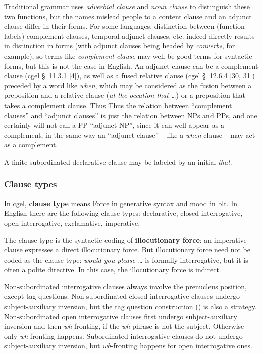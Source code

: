 \documentclass{article}
\newcommand*{\citesec}[1]{\S~{#1}}
\newcommand*{\concept}[1]{\textbf{#1}}
\newcommand*{\term}[1]{\emph{#1}}
\newcommand*{\corpus}[1]{\emph{#1}}
\begin{document}
Traditional grammar uses \term{adverbial clause} and \term{noun clause} 
to distinguish these two functions,
but the names mislead people to a content clause and an adjunct clause differ in their forms.
For some languages, distinction between (function labels) complement clauses, temporal adjunct clauses, etc. 
indeed directly results in distinction in forms
(with adjunct clauses being headed by \term{converbs}, for example),
so terms like \term{complement clause} may well be good terms for syntactic forms,
but this is not the case in English.
An adjunct clause can be a complement clause (\ac{cgel} \citesec{11.3.1} [4]),
as well as a fused relative clause (\ac{cgel} \citesec{12.6.4} [30, 31])
preceded by a word like \corpus{when},
which may be considered as the fusion between a preposition and a relative clause 
(\corpus{at the occation that \dots})
or a preposition that takes a complement clause.
Thus %
Thus the relation between ``complement clauses'' and ``adjunct clauses'' is 
just the relation between NPs and PPs, 
and one certainly will not call a PP ``adjunct NP'',
since it can well appear as a complement,
in the same way an ``adjunct clause'' -- like a \corpus{when} clause --
may act as a complement.

A finite subordinated declarative clause may be labeled by an initial \corpus{that}.

\subsubsection{Clause types}\label{sec:force}

In \ac{cgel}, \concept{clause type} means Force in generative syntax and mood in \ac{blt}.
In English there are the following clause types:
declarative, closed interrogative, open interrogative, exclamative, imperative.

The clause type is the syntactic coding of \concept{illocutionary force}:
an imperative clause expresses a direct illocutionary force.
But illocutionary force need not be coded as the clause type:
\corpus{would you please \dots} is formally interrogative, 
but it is often a polite directive.
In this case, the illocutionary force is indirect.

Non-subordinated interrogative clauses always involve the prenucleus position,
except tag questions.
Non-subordinated closed interrogative clauses undergo subject-auxiliary inversion,
but the tag question construction () is also a strategy.
Non-subordinated open interrogative clauses first undergo subject-auxiliary inversion
and then \corpus{wh}-fronting, if the \corpus{wh}-phrase is not the subject.
Otherwise only \corpus{wh}-fronting happens.
Subordinated interrogative clauses do not undergo subject-auxiliary inversion,
but \corpus{wh}-fronting happens for open interrogative ones.
\end{document}
